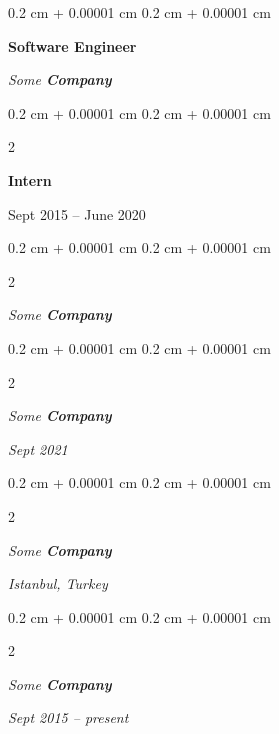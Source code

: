 \documentclass[10pt, letterpaper]{article}
\newenvironment{onecolentry}{
    \begin{adjustwidth}{
        0.2 cm + 0.00001 cm
    }{
        0.2 cm + 0.00001 cm
    }
}{
    \end{adjustwidth}
} %
\newenvironment{twocolentry}[2][]{
    \onecolentry
    \def\secondColumn{#2}
    \setcolumnwidth{\fill, 4.5 cm}
    \begin{paracol}{2}
}{
    \switchcolumn \raggedleft \secondColumn
    \end{paracol}
    \endonecolentry
} %
\begin{document}
        \vspace{0.2 cm}

            \begin{onecolentry}
                \textbf{Software Engineer}

                \textit{Some \textbf{Company}}
            \end{onecolentry}



        \vspace{0.2 cm}

                \begin{twocolentry}{
                    Sept 2015 – June 2020
                }
                \textbf{Intern}
                \end{twocolentry}
            \begin{twocolentry}{
            }
            \textit{Some \textbf{Company}}
            \end{twocolentry}



        \vspace{0.2 cm}

            \begin{twocolentry}{


        \textit{Sept 2021}    }
                \textbf{}

                \textit{Some \textbf{Company}}
            \end{twocolentry}



        \vspace{0.2 cm}

            \begin{twocolentry}{
        \textit{Istanbul, Turkey}

            }
                \textbf{}

                \textit{Some \textbf{Company}}
            \end{twocolentry}



        \vspace{0.2 cm}

            \begin{twocolentry}{


        \textit{Sept 2015 – present}    }
                \textbf{}

                \textit{Some \textbf{Company}}
            \end{twocolentry}
\end{document}
